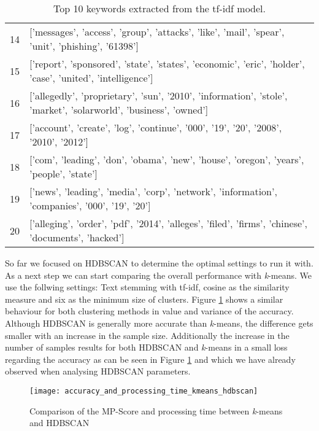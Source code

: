 \begin{table}[h]
{\begin{tabular}{rl}
            14 & ['messages', 'access', 'group', 'attacks', 'like', 'mail', 'spear', 'unit', 'phishing', '61398']                        \\
            15 & ['report', 'sponsored', 'state', 'states', 'economic', 'eric', 'holder', 'case', 'united', 'intelligence']              \\
            16 & ['allegedly', 'proprietary', 'sun', '2010', 'information', 'stole', 'market', 'solarworld', 'business', 'owned']        \\
            17 & ['account', 'create', 'log', 'continue', '000', '19', '20', '2008', '2010', '2012']                                     \\
            18 & ['com', 'leading', 'don', 'obama', 'new', 'house', 'oregon', 'years', 'people', 'state']                                \\
            19 & ['news', 'leading', 'media', 'corp', 'network', 'information', 'companies', '000', '19', '20']                          \\
            20 & ['alleging', 'order', 'pdf', '2014', 'alleges', 'filed', 'firms', 'chinese', 'documents', 'hacked']                     \\
        \hline
        \end{tabular}
        }
        \caption{Top 10 keywords extracted from the tf-idf model.}
        \label{tab:clustering_example_features}
\end{table}

So far we focused on HDBSCAN to determine the optimal settings to run it with. As a next step we can start comparing the overall performance with \textit{k}-means. We use the follwing settings: Text stemming with tf-idf, cosine as the similarity measure and six as the minimum size of clusters. Figure \ref{fig:accuracy_and_processing_time_kmeans_hdbscan} shows a similar behaviour for both clustering methods in value and variance of the accuracy. Although HDBSCAN is generally more accurate than \textit{k}-means, the difference gets smaller with an increase in the sample size. Additionally the increase in the number of samples results for both HDBSCAN and \textit{k}-means in a small loss regarding the accuracy as can be seen in Figure \ref{fig:accuracy_and_processing_time_kmeans_hdbscan} and which we have already observed when analysing HDBSCAN parameters.

\begin{figure}[h]
    \centering
    \texttt{[image: accuracy\_and\_processing\_time\_kmeans\_hdbscan]}
    \caption{Comparison of the MP-Score and processing time between \textit{k}-means and HDBSCAN}
    \label{fig:accuracy_and_processing_time_kmeans_hdbscan}
\end{figure}

